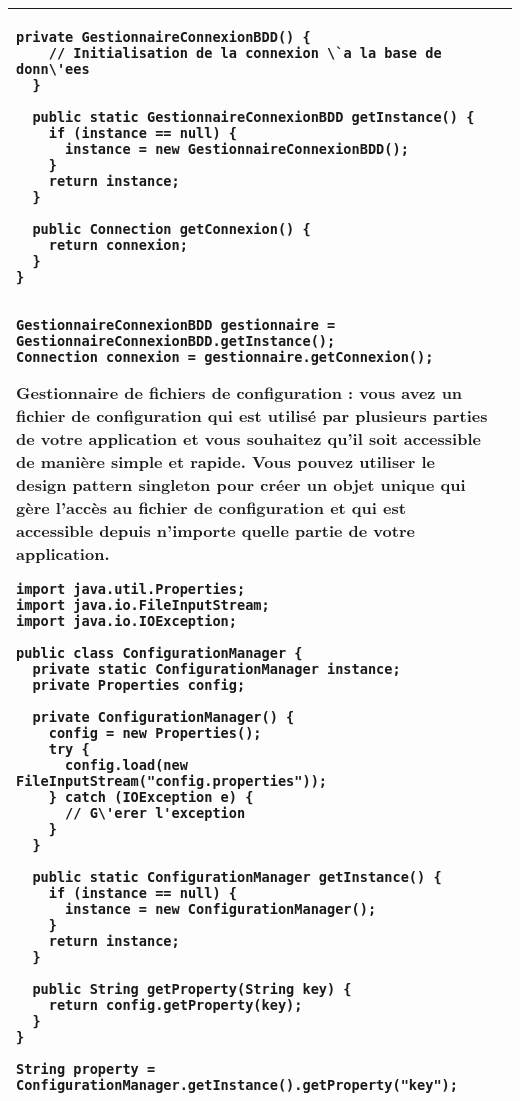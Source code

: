 \begin{table}[H]
\begin{adjustbox}{max width=\textwidth}
\begin{tabular}{l|p{\textwidth}}
\begin{minipage}[tl]{0.5\textwidth}
\begin{minipage}[b]{1\textwidth}
\begin{lstlisting}[style=monstyle]
  private GestionnaireConnexionBDD() {
    // Initialisation de la connexion \`a la base de donn\'ees
  }

  public static GestionnaireConnexionBDD getInstance() {
    if (instance == null) {
      instance = new GestionnaireConnexionBDD();
    }
    return instance;
  }

  public Connection getConnexion() {
    return connexion;
  }
}


GestionnaireConnexionBDD gestionnaire = GestionnaireConnexionBDD.getInstance();
Connection connexion = gestionnaire.getConnexion();

\end{lstlisting} 
\end{minipage}
\end{minipage}
\hspace{6mm}
\begin{minipage}[tr]{0.5\textwidth}
\begin{minipage}[t]{1\textwidth}
Gestionnaire de fichiers de configuration : vous avez un fichier de configuration qui est utilisé par plusieurs parties de votre application et vous souhaitez qu'il soit accessible de manière simple et rapide. Vous pouvez utiliser le design pattern singleton pour créer un objet unique qui gère l'accès au fichier de configuration et qui est accessible depuis n'importe quelle partie de votre application.
\end{minipage}
\begin{minipage}[b]{1\textwidth}
\begin{lstlisting}[style=monstyle]
import java.util.Properties;
import java.io.FileInputStream;
import java.io.IOException;

public class ConfigurationManager {
  private static ConfigurationManager instance;
  private Properties config;

  private ConfigurationManager() {
    config = new Properties();
    try {
      config.load(new FileInputStream("config.properties"));
    } catch (IOException e) {
      // G\'erer l'exception
    }
  }

  public static ConfigurationManager getInstance() {
    if (instance == null) {
      instance = new ConfigurationManager();
    }
    return instance;
  }

  public String getProperty(String key) {
    return config.getProperty(key);
  }
}

String property = ConfigurationManager.getInstance().getProperty("key");


\end{lstlisting}
\end{minipage}
\end{minipage}
\\

\bottomrule
\end{tabular}
\end{adjustbox}
\end{table}

